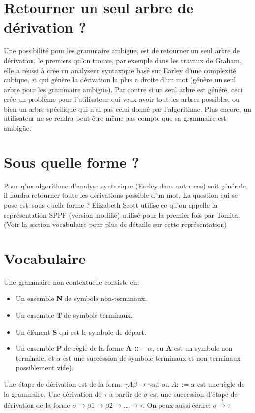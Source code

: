 \documentclass[10pt]{report}
\begin{document}
\section{Retourner un seul arbre de dérivation ?}
Une possibilité pour les grammaire ambigüe, est de retourner un seul arbre de dérivation, le premiers qu'on trouve, par exemple dans les travaux de Graham\cite{Graham}, elle a réussi à crée un analyseur syntaxique basé sur Earley d'une complexité cubique, et qui génère la dérivation la plus a droite d'un mot (génère un seul arbre pour les grammaire ambigüe). Par contre si un seul arbre est généré, ceci crée un problème pour l'utilisateur qui veux avoir tout les arbres possibles, ou bien un arbre spécifique qui n'ai pas celui donné par l'algorithme. Plus encore, un utilisateur ne se rendra peut-être même pas compte que sa grammaire est ambigüe.

\section{Sous quelle forme ?}
Pour q'un algorithme d'analyse syntaxique (Earley dans notre cas) soit générale, il faudra retourner toute les dérivations possible d'un mot. La question qui se pose est: sous quelle forme ?
Elizabeth Scott\cite{Scott} utilise ce qu'on appelle la représentation SPPF (version modifié) utilisé pour la premier fois par Tomita\cite{Tomita}. (Voir la section vocabulaire pour plus de détaille sur cette représentation)

\section{Vocabulaire}
Une grammaire non contextuelle consiste en:
\begin{itemize}
	\item Un ensemble \textbf{N} de symbole non-terminaux.
	\item Un ensemble \textbf{T} de symbole terminaux.
	\item Un élément \textbf{S} qui est le symbole de départ.
	\item Un ensemble \textbf{P} de règle de la forme \textbf{A ::= $\alpha$}, ou \textbf{A} est un symbole non terminale, et \textbf{$\alpha$} est une succession de symbole terminaux et non-terminaux possiblement vide).
\end{itemize}

Une étape de dérivation est de la form: $\gamma A \beta \rightarrow \gamma \alpha \beta$  ou $A ::= \alpha$ est une règle de la grammaire. Une dérivation de $\tau$ a partir de $\sigma$ est une succession d'étape de dérivation de la forme $\sigma \rightarrow \beta1 \rightarrow \beta2 \rightarrow ... \rightarrow \tau$. On peux aussi écrire: $\sigma \xrightarrow* \tau$
\end{document}
